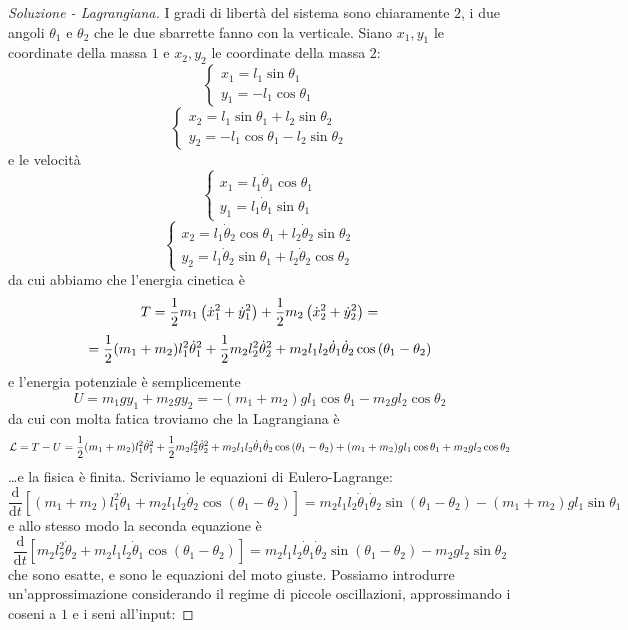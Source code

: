 \documentclass[11pt]{scrartcl}
\newcommand{\dif}{\text{d}}
\begin{document}
	\begin{sol}
		\begin{proof}[Soluzione - Lagrangiana]
			I gradi di libertà del sistema sono chiaramente $2$, i due angoli $\theta_1$ e $\theta_2$ che le due sbarrette fanno con la verticale. Siano $x_1,y_1$ le coordinate della massa $1$ e $x_2,y_2$ le coordinate della massa $2$:
			$$
			\begin{cases}
				x_1=l_1\sin\theta_1 \\
				y_1=-l_1\cos\theta_1
			\end{cases}
			$$
			$$
			\begin{cases}
				x_2 = l_1\sin\theta_1+l_2\sin\theta_2 \\
				y_2=-l_1\cos\theta_1-l_2\sin\theta_2
			\end{cases}
			$$
			e le velocità
			$$
			\begin{cases}
				x_1=l_1\dot{\theta}_1\cos\theta_1 \\
				y_1=l_1\dot{\theta}_1\sin\theta_1
			\end{cases}
			$$
			$$
			\begin{cases}
				x_2 = l_1\dot{\theta}_2\cos\theta_1+l_2\dot{\theta}_2\sin\theta_2 \\
				y_2=l_1\dot{\theta}_2\sin\theta_1+l_2\dot{\theta}_2\cos\theta_2
			\end{cases}
			$$
			da cui abbiamo che l'energia cinetica è
			$$T=\frac{1}{2} m_1\left(\dot{x}_1^2+\dot{y}_1^2\right)+\frac{1}{2} m_2\left(\dot{x}_2^2+\dot{y}_2^2\right)=$$
			$$=\frac{1}{2} (m_1+m_2)l_1^2\dot{\theta}_1^2+\frac{1}{2} m_2l_2^2\dot{\theta}^2_2+m_2l_1l_2\dot{\theta}_1\dot{\theta}_2\cos\left(\theta_1-\theta_2\right)$$
			e l'energia potenziale è semplicemente
			$$U=m_1gy_1+m_2gy_2=-(m_1+m_2)gl_1\cos\theta_1-m_2gl_2\cos\theta_2$$
			da cui con molta fatica troviamo che la Lagrangiana è
			$$\mathcal{L}=T-U=\frac{1}{2} (m_1+m_2)l_1^2\dot{\theta}_1^2+\frac{1}{2} m_2l_2^2\dot{\theta}^2_2+m_2l_1l_2\dot{\theta}_1\dot{\theta}_2\cos\left(\theta_1-\theta_2\right)+(m_1+m_2)gl_1\cos\theta_1+m_2gl_2\cos\theta_2$$
			\dots e la fisica è finita. Scriviamo le equazioni di Eulero-Lagrange:
			$$\frac{\dif}{\dif t}\left[(m_1+m_2)l_1^2\dot{\theta}_1+m_2l_1l_2\dot{\theta}_2\cos(\theta_1-\theta_2)\right]=m_2l_1l_2\dot{\theta}_1\dot{\theta}_2\sin(\theta_1-\theta_2)-(m_1+m_2)gl_1\sin\theta_1$$
			e allo stesso modo la seconda equazione è
			$$\frac{\dif}{\dif t}\left[m_2l_2^2\dot{\theta}_2+m_2l_1l_2\dot{\theta}_1\cos(\theta_1-\theta_2)\right]=m_2l_1l_2\dot{\theta}_1\dot{\theta}_2\sin(\theta_1-\theta_2)-m_2gl_2\sin\theta_2$$
			che sono esatte, e sono le equazioni del moto giuste. Possiamo introdurre un'approssimazione considerando il regime di piccole oscillazioni, approssimando i coseni a $1$ e i seni all'input:

\end{proof}
\end{sol}
\end{document}
